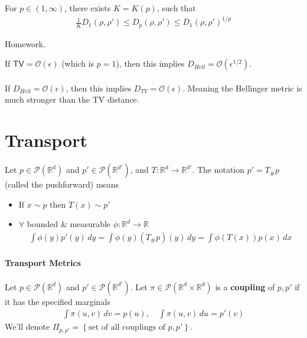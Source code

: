 \documentclass[11pt,fleqn]{article}
\numberwithin{equation}{section}
\theoremstyle{definition}
\theoremstyle{definition}
\renewenvironment{proof}[1][\proofname]{\vspace{-10pt}\begin{replacementproof}}{\end{replacementproof}}
\begin{document}
\begin{theorem}
	For $p \in (1, \infty)$, there exists $K = K(p)$, such that
	\begin{align}
		\frac{1}{K}D_1(\rho,\rho') \leq D_p (\rho, \rho') \leq D_1(\rho, \rho')^{1/p}
	\end{align}
\end{theorem}
\begin{proof}
	Homework.
\end{proof}

\begin{eg}
	If $\textsf{TV} = \mathcal O(\epsilon)$ (which is $p=1$), then this implies $D_{Hell} = \mathcal O(\epsilon^{1/2})$.\\
	\\
	If $D_{Hell} = \mathcal O(\epsilon)$, then this implies $D_{TV}= \mathcal O(\epsilon)$. Meaning the Hellinger metric is much stronger than the TV distance.
\end{eg}

\newpage
\section{Transport}
 
\begin{definition}
	[Pushforward] Let $p \in \mathcal P(\mathbb R^d)$ and $p' \in \mathcal P(\mathbb R^{d'})$, and $T : \mathbb R^d \to \mathbb R^{d'}$. The notation $p' = T_\# p$   (called the pushforward) means
	\begin{itemize}
		\item If $x \sim p$ then $T(x) \sim p'$
		\item $\forall$ bounded \& measurable $\phi: \mathbb R^d \to \mathbb R$
		\begin{align}
			\int \phi(y) p'(y) \, dy = \int \phi(y) (T_\# p)(y) \, dy = \int \phi(T(x)) p(x) \,dx
		\end{align}
	\end{itemize}
\end{definition}

\paragraph{Transport Metrics}
\begin{definition}
	[Coupling] Let $p \in \mathcal P(\mathbb R^d)$ and $p' \in \mathcal P(\mathbb R^{d'})$. Let $\pi \in \mathcal P(\mathbb R^d \times \mathbb R^d)$ is a \textbf{coupling} of $p, p'$ if it has the specified marginals
	\begin{align}
		\int \pi(u,v) \, dv = p(u), \quad \int \pi(u,v) \, du = p'(v)
	\end{align}
	We'll denote $\Pi_{p,p'} = \left\{ \text{set of all couplings of } p,p' \right\}$.
\end{definition}
\end{document}
